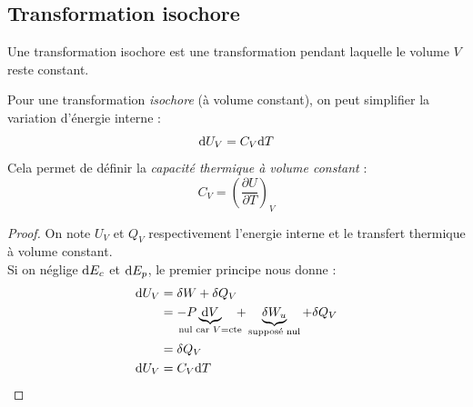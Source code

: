 \documentclass[11pt,a4paper,fleqn,pdftex]{report}
\begin{document}
\subsection{Transformation isochore} %
\label{sub:transformation_isochore}
Une transformation isochore est une transformation pendant laquelle le volume $V$ reste constant.
\begin{theorem}
  Pour une transformation \emph{isochore} (à volume constant), on peut simplifier la variation d'énergie interne : 
   \begin{equation}
   \mathrm{d} U_V = C_V \mathrm{d} T
   \end{equation}
   Cela permet de définir la \emph{capacité thermique à volume constant} : 
   \begin{equation}
   C_V = \left( \dfrac{\partial U}{\partial T} \right)_V
   \end{equation}
\end{theorem}
\begin{proof}
   On note $U_V$ et $Q_V$ respectivement l'energie interne et le transfert thermique à volume constant.\\
   Si on néglige $\mathrm{d} E_c$ et $\mathrm{d} E_p$, le premier principe nous donne : 
   \begin{align*}
      \d U_V &= \delta W +\delta Q_V \\
           &= -P\underbrace{\d V}_{\mathclap{\text{nul car }V=\text{cte}}} \quad + \underbrace{\delta W_u}_{\text{supposé nul}} + \delta Q_V \\
           &= \delta Q_V \\
      \d U_V &= C_V\d T
   \end{align*}
\end{proof}
\end{document}
